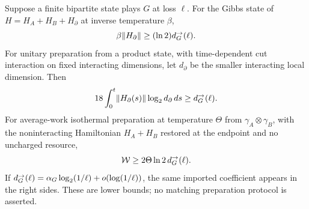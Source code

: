 \begin{theorem}\label{thm:resources}
Suppose a finite bipartite state plays $G$ at loss $\ell$.
For the Gibbs state of $H=H_A+H_B+H_\partial$ at inverse temperature
$\beta$,
\begin{equation}\label{eq:temperature}
 \beta\lVert H_\partial\rVert\geq(\ln2)d_G^{\to}(\ell).
\end{equation}
For unitary preparation from a product state, with time-dependent cut
interaction on fixed interacting dimensions, let $d_\partial$ be
the smaller interacting local dimension. Then
\begin{equation}\label{eq:time}
 18\int_0^t\lVert H_\partial(s)\rVert\log_2d_\partial\,ds
                       \geq d_G^{\to}(\ell).
\end{equation}
For average-work isothermal preparation at temperature $\Theta$ from
$\gamma_A\otimes\gamma_B$, with the noninteracting Hamiltonian
$H_A+H_B$ restored at the endpoint and no uncharged resource,
\begin{equation}\label{eq:work}
 \mathcal W\geq2\Theta\ln2\,d_G^{\to}(\ell).
\end{equation}
If $d_G^{\to}(\ell)=\alpha_G\log_2(1/\ell)+o(\log(1/\ell))$,
the same imported coefficient appears in the right sides. These are
lower bounds; no matching preparation protocol is asserted.
\end{theorem}
